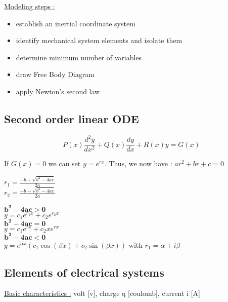 \documentclass[../main.tex]{subfiles}
\begin{document}
\quad \underline{Modeling steps :} \begin{itemize}
    \item establish an inertial coordinate system\\
    \item identify mechanical system elements and isolate them\\
    \item determine minimum number of variables\\
    \item draw Free Body Diagram\\
    \item apply Newton's second law\\
\end{itemize}

\subsection{Second order linear ODE}
\begin{equation}
    P(x) \frac{d^2y}{dx^2} + Q(x) \frac{dy}{dx} + R(x) y = G(x)
\end{equation}

If $G(x) = 0$ we can set $y=e^{rx}$. Thus, we now have : $ar^2+br+c=0$\\
\begin{minipage}{.5\textwidth}
$r_1 = \frac{-b + \sqrt{b^2-4ac}}{2a}$\\
$r_2 = \frac{-b - \sqrt{b^2-4ac}}{2a}$\\
\end{minipage}
\hfill
\begin{minipage}{.5\textwidth}
$\mathbf{b^2 - 4ac > 0}$\\
$y = c_1 e^{r_1x} + c_2e^{r_2x}$\\

$\mathbf{b^2-4ac = 0}$\\
$y=c_1e^{rx}+c_2xe^{rx}$\\

$\mathbf{b^2-4ac<0}$\\
$y = e^{\alpha x}(c_1 \cos{(\beta x)} + c_2 \sin{(\beta x)})$ with $r_1 = \alpha + i\beta$\\
\end{minipage}

\subsection{Elements of electrical systems}
\underline{Basic characteristics :} volt [v], charge q [coulomb], current i [A]\\
\end{document}
